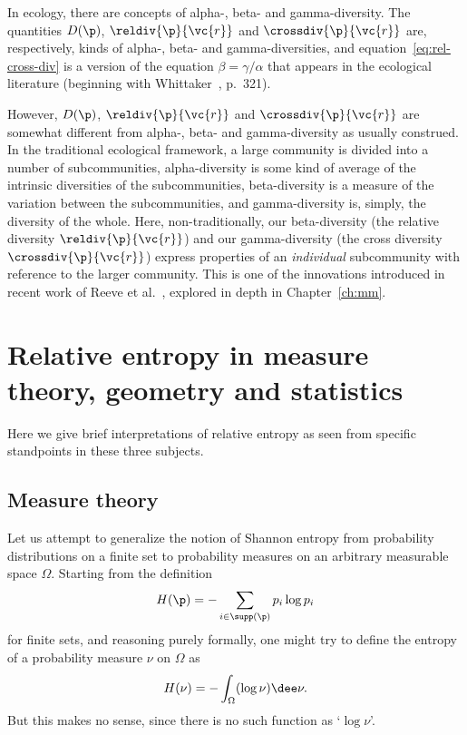 \begin{remark}
In ecology, there are concepts of alpha-,
beta- and gamma-diversity.
% 
%
%
The quantities $D(\p)$, $\reldiv{\p}{\vc{r}}$ and $\crossdiv{\p}{\vc{r}}$
are, respectively, kinds of alpha-, beta- and gamma-diversities, and
equation~\eqref{eq:rel-cross-div} is a version of the equation $\beta =
\gamma/\alpha$ that appears in the ecological literature (beginning with
Whittaker~\cite{WhitVSM},%
%
%
p.~321).

However, $D(\p)$, $\reldiv{\p}{\vc{r}}$ and $\crossdiv{\p}{\vc{r}}$ are
somewhat different from \mbox{alpha-,} beta- and gamma-diversity as usually
construed.  In the traditional ecological framework, a large community is
divided into a number of subcommunities, alpha-diversity is some kind of
average of the intrinsic diversities of the subcommunities, beta-diversity
is a measure of the variation between the subcommunities, and
gamma-diversity is, simply, the diversity of the whole.  Here,
non-traditionally, our beta-diversity (the relative diversity
$\reldiv{\p}{\vc{r}}$) and our gamma-diversity (the cross diversity
$\crossdiv{\p}{\vc{r}}$) express properties of an \emph{individual}
subcommunity with reference to the larger community.
% 
This is one of the innovations introduced in recent work of Reeve%
%
% 
et al.~\cite{HPD}, explored in depth in Chapter~\ref{ch:mm}.
\end{remark}


\section{Relative entropy in measure theory, geometry and statistics}
%
%

Here we give brief interpretations of relative entropy as seen from
specific standpoints in these three subjects.  


\subsection*{Measure theory}


Let us attempt to generalize the notion of Shannon entropy from probability
distributions on a finite set to probability measures on an arbitrary
measurable space $\Omega$.  Starting from the definition
\[
H(\p) = - \sum_{i \in \supp(\p)} p_i \log p_i
\]
for finite sets, and reasoning purely formally, one might try to define the
entropy%
%
% 
of a probability measure $\nu$ on $\Omega$ as
\[
H(\nu) = - \int_\Omega (\log \nu) \dee\nu.
\]
But this makes no sense, since there is no such function as `$\log \nu$'.

